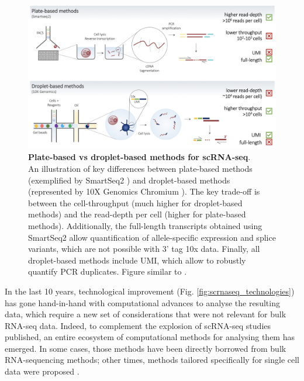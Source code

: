 \begin{figure}[h]
\centering
\includegraphics[width=16cm]{Chapter3/Fig/plate_vs_droplet.png}
\caption[scRNA-seq plate vs droplet]{\textbf{Plate-based vs droplet-based methods for scRNA-seq}.\\
An illustration of key differences between plate-based methods (exemplified by SmartSeq2 \cite{picelli2013smart}) and droplet-based methods (represented by 10X Genomics Chromium \cite{zheng2017massively}).
The key trade-off is between the cell-throughput (much higher for droplet-based methods) and the read-depth per cell (higher for plate-based methods).
Additionally, the full-length transcripts obtained using SmartSeq2 allow quantification of allele-specific expression and splice variants, which are not possible with 3' tag 10x data.
Finally, all droplet-based methods include UMI, which allow to robustly quantify PCR duplicates.
Figure similar to \cite{griffiths2018using}.}
\label{fig:scrnaseq_plate_vs_droplet}
\end{figure}


In the last 10 years, technological improvement (Fig. \ref{fig:scrnaseq_technologies}) has gone hand-in-hand with computational advances to analyse the resulting data, which require a new set of considerations that were not relevant for bulk RNA-seq data.
Indeed, to complement the explosion of scRNA-seq studies published, an entire ecosystem of computational methods for analysing them has emerged.
In some cases, those methods have been directly borrowed from bulk RNA-sequencing methods; other times, methods tailored specifically for single cell data were proposed \cite{stegle2015computational, zappia2018exploring, luecken2019current}.


